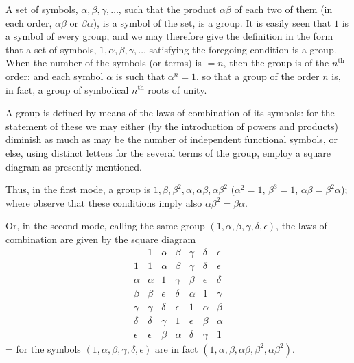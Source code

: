 \documentclass[11pt]{article}
\begin{document}
\medskip

A set of symbols, $\alpha, \beta, \gamma, \ldots$, such that the product $\alpha\beta$ of each two of them (in each order, $\alpha\beta$ or $\beta\alpha$), is a symbol of the set, is a group. It is easily seen that $1$ is a symbol of every group, and we may therefore give the definition in the form that a set of symbols, $1, \alpha, \beta, \gamma, \ldots$ satisfying the foregoing condition is a group. When the number of the symbols (or terms) is $=n$, then the group is of the $n^{\text{th}}$ order; and each symbol $\alpha$ is such that $\alpha^{n} = 1$, so that a group of the order $n$ is, in fact, a group of symbolical $n^{\text{th}}$ roots of unity.

\medskip

A group is defined by means of the laws of combination of its symbols: for the statement of these we may either (by the introduction of powers and products) diminish as much as may be the number of independent functional symbols, or else, using distinct letters for the several terms of the group, employ a square diagram as presently mentioned.

\medskip

Thus, in the first mode, a group is $1, \beta, \beta^{2}, \alpha, \alpha\beta, \alpha\beta^{2}$ \;($\alpha^{2}=1$, $\beta^{3}=1$, $\alpha\beta = \beta^{2}\alpha$); where observe that these conditions imply also $\alpha\beta^{2} = \beta\alpha$.

\medskip

Or, in the second mode, calling the same group $(1, \alpha, \beta, \gamma, \delta, \epsilon)$, the laws of combination are given by the square diagram
\[
\begin{array}{c|cccccc}
   & 1 & \alpha & \beta & \gamma & \delta & \epsilon \\\hline
1  & 1 & \alpha & \beta & \gamma & \delta & \epsilon \\
\alpha & \alpha & 1 & \gamma & \beta & \epsilon & \delta \\
\beta  & \beta & \epsilon & \delta & \alpha & 1 & \gamma \\
\gamma & \gamma & \delta & \epsilon & 1 & \alpha & \beta \\
\delta & \delta & \gamma & 1 & \epsilon & \beta & \alpha \\
\epsilon & \epsilon & \beta & \alpha & \delta & \gamma & 1
\end{array}
\]
= for the symbols $(1, \alpha, \beta, \gamma, \delta, \epsilon)$ are in fact $(1, \alpha, \beta, \alpha\beta, \beta^{2}, \alpha\beta^{2})$.
\end{document}
